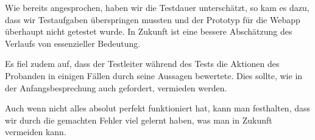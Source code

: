 Wie bereits angesprochen, haben wir die Testdauer unterschätzt, so kam es dazu, dass wir Testaufgaben überspringen mussten und der Prototyp für die Webapp überhaupt nicht getestet wurde. In Zukunft ist eine bessere Abschätzung des Verlaufs von essenzieller Bedeutung.

Es fiel zudem auf, dass der Testleiter während des Tests die Aktionen des Probanden in einigen Fällen durch seine Aussagen bewertete. Dies sollte, wie in der Anfangsbesprechung auch gefordert, vermieden werden.

Auch wenn nicht alles absolut perfekt funktioniert hat, kann man festhalten, dass wir durch die gemachten Fehler viel gelernt haben, was man in Zukunft vermeiden kann.

\clearpage